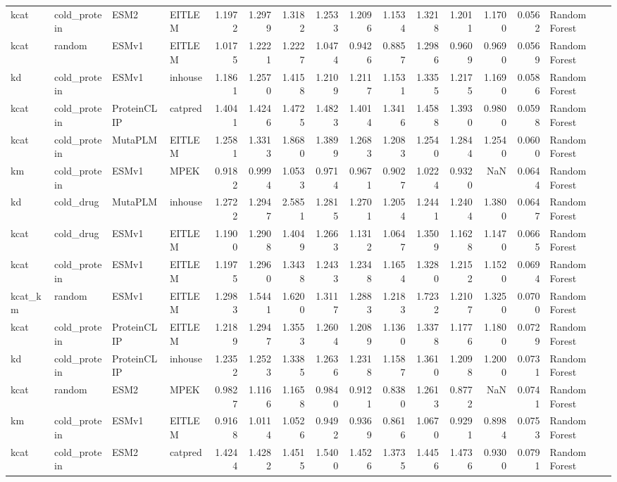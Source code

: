 \begin{tabular}{llllrrrrrrrrrrl}
kcat & cold_protein & ESM2 & EITLEM & 1.1972 & 1.2979 & 1.3182 & 1.2533 & 1.2096 & 1.1534 & 1.3218 & 1.2011 & 1.1700 & 0.0562 & Random Forest \\
kcat & random & ESMv1 & EITLEM & 1.0175 & 1.2221 & 1.2227 & 1.0474 & 0.9426 & 0.8857 & 1.2986 & 0.9609 & 0.9690 & 0.0569 & Random Forest \\
kd & cold_protein & ESMv1 & inhouse & 1.1861 & 1.2570 & 1.4158 & 1.2109 & 1.2117 & 1.1531 & 1.3355 & 1.2175 & 1.1690 & 0.0586 & Random Forest \\
kcat & cold_protein & ProteinCLIP & catpred & 1.4041 & 1.4246 & 1.4725 & 1.4823 & 1.4014 & 1.3416 & 1.4588 & 1.3930 & 0.9800 & 0.0598 & Random Forest \\
kcat & cold_protein & MutaPLM & EITLEM & 1.2581 & 1.3313 & 1.8680 & 1.3899 & 1.2683 & 1.2083 & 1.2540 & 1.2844 & 1.2540 & 0.0600 & Random Forest \\
km & cold_protein & ESMv1 & MPEK & 0.9182 & 0.9994 & 1.0533 & 0.9714 & 0.9671 & 0.9027 & 1.0224 & 0.9320 & NaN & 0.0644 & Random Forest \\
kd & cold_drug & MutaPLM & inhouse & 1.2722 & 1.2947 & 2.5851 & 1.2815 & 1.2701 & 1.2054 & 1.2441 & 1.2404 & 1.3800 & 0.0647 & Random Forest \\
kcat & cold_drug & ESMv1 & EITLEM & 1.1900 & 1.2908 & 1.4049 & 1.2663 & 1.1312 & 1.0647 & 1.3509 & 1.1628 & 1.1470 & 0.0665 & Random Forest \\
kcat & cold_protein & ESMv1 & EITLEM & 1.1975 & 1.2960 & 1.3438 & 1.2433 & 1.2348 & 1.1654 & 1.3280 & 1.2152 & 1.1520 & 0.0694 & Random Forest \\
kcat_km & random & ESMv1 & EITLEM & 1.2983 & 1.5441 & 1.6200 & 1.3117 & 1.2883 & 1.2183 & 1.7232 & 1.2107 & 1.3250 & 0.0700 & Random Forest \\
kcat & cold_protein & ProteinCLIP & EITLEM & 1.2189 & 1.2947 & 1.3553 & 1.2604 & 1.2089 & 1.1360 & 1.3378 & 1.1776 & 1.1800 & 0.0729 & Random Forest \\
kd & cold_protein & ProteinCLIP & inhouse & 1.2352 & 1.2523 & 1.3385 & 1.2636 & 1.2318 & 1.1587 & 1.3610 & 1.2098 & 1.2000 & 0.0731 & Random Forest \\
kcat & random & ESM2 & MPEK & 0.9827 & 1.1166 & 1.1658 & 0.9840 & 0.9121 & 0.8380 & 1.2613 & 0.8772 & NaN & 0.0741 & Random Forest \\
km & cold_protein & ESMv1 & EITLEM & 0.9168 & 1.0114 & 1.0526 & 0.9492 & 0.9369 & 0.8616 & 1.0670 & 0.9291 & 0.8984 & 0.0753 & Random Forest \\
kcat & cold_protein & ESM2 & catpred & 1.4244 & 1.4282 & 1.4515 & 1.5400 & 1.4526 & 1.3735 & 1.4456 & 1.4736 & 0.9300 & 0.0791 & Random Forest \\

\end{tabular}

